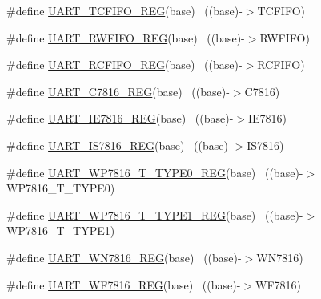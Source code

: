 \begin{DoxyCompactItemize}
\item 
\#define \hyperlink{group___u_a_r_t___register___accessor___macros_ga3c989ec09106d40a7499376ee50043cb}{U\+A\+R\+T\+\_\+\+T\+C\+F\+I\+F\+O\+\_\+\+R\+EG}(base)                                    ~((base)-\/$>$T\+C\+F\+I\+FO)
\item 
\#define \hyperlink{group___u_a_r_t___register___accessor___macros_ga3835d8ca2bff395228fd298041588e27}{U\+A\+R\+T\+\_\+\+R\+W\+F\+I\+F\+O\+\_\+\+R\+EG}(base)                                    ~((base)-\/$>$R\+W\+F\+I\+FO)
\item 
\#define \hyperlink{group___u_a_r_t___register___accessor___macros_ga45b1614543eafe052567800963874056}{U\+A\+R\+T\+\_\+\+R\+C\+F\+I\+F\+O\+\_\+\+R\+EG}(base)                                    ~((base)-\/$>$R\+C\+F\+I\+FO)
\item 
\#define \hyperlink{group___u_a_r_t___register___accessor___macros_ga21a48aa0a2ba6e0202b47d6ff091e689}{U\+A\+R\+T\+\_\+\+C7816\+\_\+\+R\+EG}(base)                                      ~((base)-\/$>$C7816)
\item 
\#define \hyperlink{group___u_a_r_t___register___accessor___macros_ga5b90f8b81565b881d6c249581ebcbb75}{U\+A\+R\+T\+\_\+\+I\+E7816\+\_\+\+R\+EG}(base)                                    ~((base)-\/$>$I\+E7816)
\item 
\#define \hyperlink{group___u_a_r_t___register___accessor___macros_ga70744022bbc57cc63807b79daa7b3341}{U\+A\+R\+T\+\_\+\+I\+S7816\+\_\+\+R\+EG}(base)                                    ~((base)-\/$>$I\+S7816)
\item 
\#define \hyperlink{group___u_a_r_t___register___accessor___macros_gae15cd9484cdbcf68a1ca6a3970c22aed}{U\+A\+R\+T\+\_\+\+W\+P7816\+\_\+\+T\+\_\+\+T\+Y\+P\+E0\+\_\+\+R\+EG}(base)                    ~((base)-\/$>$W\+P7816\+\_\+\+T\+\_\+\+T\+Y\+P\+E0)
\item 
\#define \hyperlink{group___u_a_r_t___register___accessor___macros_gaf125f8e0b4618c70042e9007e77775de}{U\+A\+R\+T\+\_\+\+W\+P7816\+\_\+\+T\+\_\+\+T\+Y\+P\+E1\+\_\+\+R\+EG}(base)                    ~((base)-\/$>$W\+P7816\+\_\+\+T\+\_\+\+T\+Y\+P\+E1)
\item 
\#define \hyperlink{group___u_a_r_t___register___accessor___macros_gaf7886bbd2d26e698f9c3e2037c2f9668}{U\+A\+R\+T\+\_\+\+W\+N7816\+\_\+\+R\+EG}(base)                                    ~((base)-\/$>$W\+N7816)
\item 
\#define \hyperlink{group___u_a_r_t___register___accessor___macros_gaf1e0b56a76d8a2c4ca3779df8ffbf777}{U\+A\+R\+T\+\_\+\+W\+F7816\+\_\+\+R\+EG}(base)                                    ~((base)-\/$>$W\+F7816)

\end{DoxyCompactItemize}
